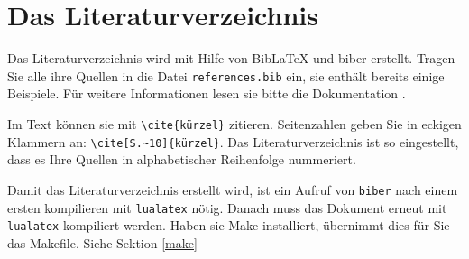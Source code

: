 \section{Das Literaturverzeichnis}

Das Literaturverzeichnis wird mit Hilfe von BibLaTeX und biber erstellt.
Tragen Sie alle ihre Quellen in die Datei \texttt{references.bib} ein, sie enthält bereits
einige Beispiele. Für weitere Informationen lesen sie bitte die Dokumentation \cite{biblatex}.

Im Text können sie mit \verb_\cite{kürzel}_ zitieren. Seitenzahlen geben Sie in eckigen Klammern an:
\verb_\cite[S.~10]{kürzel}_. Das Literaturverzeichnis ist so eingestellt, dass es Ihre Quellen in alphabetischer Reihenfolge nummeriert.

Damit das Literaturverzeichnis erstellt wird, ist ein Aufruf von \texttt{biber} nach einem ersten kompilieren mit \texttt{lualatex} nötig. Danach muss das Dokument erneut mit \texttt{lualatex} kompiliert werden. Haben sie Make installiert, übernimmt dies für Sie das Makefile. Siehe Sektion \ref{make}
